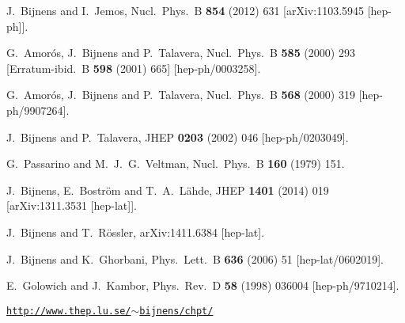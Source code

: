 \documentclass[12pt,a4paper]{article}
\begin{document}
\begin{thebibliography}{99}
  J.~Bijnens and I.~Jemos,
  Nucl.\ Phys.\ B {\bf 854} (2012) 631
  [arXiv:1103.5945 [hep-ph]].

  G.~Amor\'os, J.~Bijnens and P.~Talavera,
  Nucl.\ Phys.\ B {\bf 585} (2000) 293
   [Erratum-ibid.\ B {\bf 598} (2001) 665]
  [hep-ph/0003258].

  G.~Amor\'os, J.~Bijnens and P.~Talavera,
  Nucl.\ Phys.\ B {\bf 568} (2000) 319
  [hep-ph/9907264].

  J.~Bijnens and P.~Talavera,
  JHEP {\bf 0203} (2002) 046
  [hep-ph/0203049].

  G.~Passarino and M.~J.~G.~Veltman,
  Nucl.\ Phys.\ B {\bf 160} (1979) 151.

  J.~Bijnens, E.~Bostr\"om and T.~A.~L\"ahde,
  JHEP {\bf 1401} (2014) 019
  [arXiv:1311.3531 [hep-lat]].

  J.~Bijnens and T.~R\"ossler,
  arXiv:1411.6384 [hep-lat].

  J.~Bijnens and K.~Ghorbani,
  Phys.\ Lett.\ B {\bf 636} (2006) 51
  [hep-lat/0602019].


  E.~Golowich and J.~Kambor,
  Phys.\ Rev.\ D {\bf 58} (1998) 036004
  [hep-ph/9710214].

 \href{http://www.thep.lu.se/~bijnens/chpt/}{\tt http://www.thep.lu.se/$\sim$bijnens/chpt/}
 
\end{thebibliography}
\end{document}
